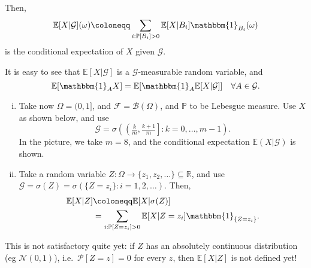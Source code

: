 \documentclass{article}
\newcommand{\F}{\mathcal{F}}
\newcommand{\G}{\mathcal{G}}
\newcommand{\1}[1]{\mathbbm{1}_{#1}}
\newcommand{\Prob}{\mathbb{P}}
\newcommand{\E}{\mathbb{E}}
\begin{document}
Then,
\begin{equation*}
  \E[X | \G] (\omega) \coloneqq \sum_{i : \Prob[B_i] > 0} \E[X | B_i] \1{B_i}(\omega)
\end{equation*}
is the conditional expectation of $X$ given $\G$.

It is easy to see that $\E[X | \G]$ is a $\G$-measurable random variable, and
\begin{equation*}
  \E[\1{A} X] = \E[\1{A} \E[X|\G]] \quad \forall A \in \G
.\end{equation*}

\begin{eg}\leavevmode
  \begin{enumerate}[(i)]
    \item
      Take now $\Omega = (0, 1]$, and $\F = \mathcal{B} (\Omega)$, and $\Prob$ to be Lebesgue measure.
      Use $X$ as shown below, and use
      \begin{equation*}
        \G = \sigma\left(\left(\tfrac{k}{m}, \tfrac{k+1}m\right] : k = 0, \dotsc, m-1\right)
      .\end{equation*}
      In the picture, we take $m=8$, and the conditional expectation $\E(X | \G)$ is shown.
      \begin{center}
      \end{center}
    \item Take a random variable $Z: \Omega \to \{z_1, z_2, \dotsc\} \subseteq \mathbb{R}$, and use $\G = \sigma(Z) = \sigma(\{Z = z_i\} : i = 1,2, \dotsc)$.
      Then,
      \begin{align*}
        \E[X | Z]  &\coloneqq \E[X | \sigma(Z)]  \\
      &= \sum_{{i : \Prob[Z = z_i] > 0}} \E[X | Z=z_i] \1{\{Z=z_i\}}
      .\end{align*}
  \end{enumerate}
\end{eg}
This is not satisfactory quite yet: if $Z$ has an absolutely continuous distribution (eg $\mathcal{N}(0,1)$), i.e.\ $\mathcal{P}[Z =z] = 0$ for every $z$, then $\E[X | Z]$ is not defined yet!
\end{document}
